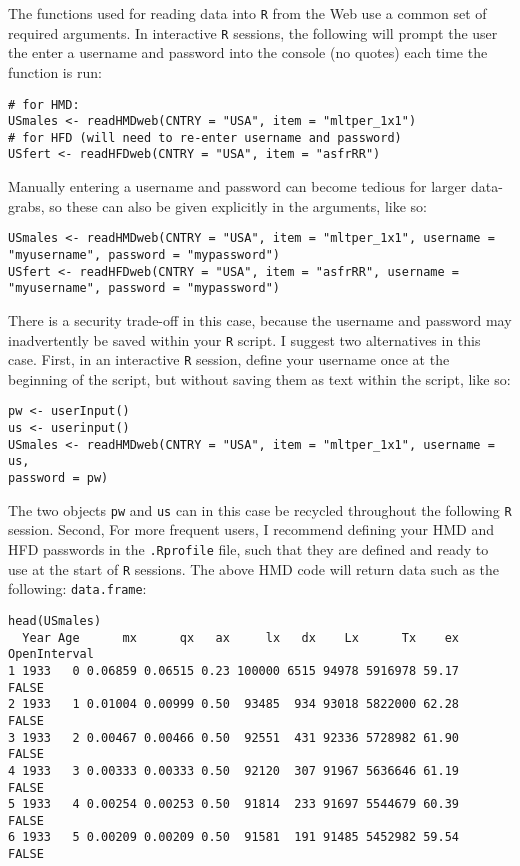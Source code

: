 \documentclass{article}
\begin{document}
The functions used for reading data into \texttt{R} from the Web use a
common set of required arguments. In interactive \texttt{R} sessions, the
following will prompt the user the enter a username and password into the
console (no quotes) each time the function is run:
\begin{small}
\begin{verbatim}
# for HMD:
USmales <- readHMDweb(CNTRY = "USA", item = "mltper_1x1")
# for HFD (will need to re-enter username and password)
USfert <- readHFDweb(CNTRY = "USA", item = "asfrRR")
\end{verbatim}
\end{small}
Manually entering a username and password can become tedious for larger
data-grabs, so these can also be given explicitly in the arguments, like so:
\begin{small}
\begin{verbatim}
USmales <- readHMDweb(CNTRY = "USA", item = "mltper_1x1", username =
"myusername", password = "mypassword")
USfert <- readHFDweb(CNTRY = "USA", item = "asfrRR", username =
"myusername", password = "mypassword")
\end{verbatim}
\end{small}
There is a security trade-off in this case, because the username and password
may inadvertently be saved within your \texttt{R} script. I suggest two
alternatives in this case. First, in an interactive \texttt{R} session, define your username once at
the beginning of the script, but without saving them as text within the script,
like so:
\begin{small}
\begin{verbatim}
pw <- userInput()
us <- userinput()
USmales <- readHMDweb(CNTRY = "USA", item = "mltper_1x1", username = us,
password = pw)
\end{verbatim}
\end{small}
The two objects \texttt{pw} and \texttt{us} can in this case be recycled
throughout the following \texttt{R} session. Second, For more frequent users, I
recommend defining your HMD and HFD passwords in the \texttt{.Rprofile} file,
such that they are defined and ready to use at the start of \texttt{R}
sessions. The above HMD code will return data such as the following:
\texttt{data.frame}:
\begin{small}
\begin{verbatim}
head(USmales)
  Year Age      mx      qx   ax     lx   dx    Lx      Tx    ex OpenInterval
1 1933   0 0.06859 0.06515 0.23 100000 6515 94978 5916978 59.17        FALSE
2 1933   1 0.01004 0.00999 0.50  93485  934 93018 5822000 62.28        FALSE
3 1933   2 0.00467 0.00466 0.50  92551  431 92336 5728982 61.90        FALSE
4 1933   3 0.00333 0.00333 0.50  92120  307 91967 5636646 61.19        FALSE
5 1933   4 0.00254 0.00253 0.50  91814  233 91697 5544679 60.39        FALSE
6 1933   5 0.00209 0.00209 0.50  91581  191 91485 5452982 59.54        FALSE
\end{verbatim}
\end{small}
\end{document}
